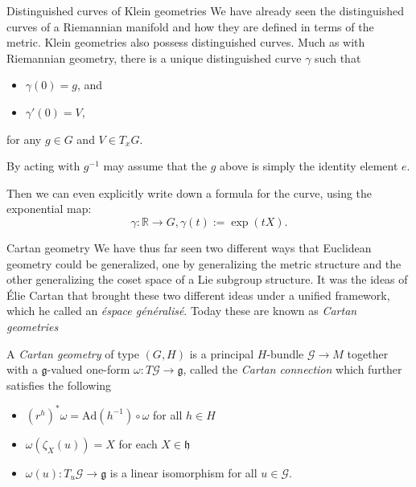 \documentclass[handout]{beamer}
\newcommand{\RR}{\mathbb{R}}
\begin{document}
\begin{frame}{Distinguished curves of Klein geometries}
  We have already seen the distinguished curves of a Riemannian manifold and how they are defined in terms of the metric.
  Klein geometries also possess distinguished curves. 
  Much as with Riemannian geometry, there is a unique distinguished curve $\gamma$ such that 
  \begin{itemize}
    \item $\gamma(0) = g$, and 
    \item $\gamma'(0) = V$,
  \end{itemize}
  for any $g\in G$ and $V \in T_x G$.

  By acting with $g^{-1}$ may assume that the $g$ above is simply the identity element $e$.

  Then we can even explicitly write down a formula for the curve, using the exponential map:
  \[
    \gamma : \RR \to G, \gamma(t) := \exp(tX).
  \]
\end{frame}

\begin{frame}{Cartan geometry}
  We have thus far seen two different ways that Euclidean geometry could be generalized, one by generalizing the metric structure and the other generalizing the coset space of a Lie subgroup structure.
  It was the ideas of \'{E}lie Cartan that brought these two different ideas under a unified framework, which he called an \emph{\'{e}space g\'{e}n\'{e}ralis\'{e}}.
  Today these are known as \emph{Cartan geometries}
  \begin{definition}
    A \emph{Cartan geometry} of type $(G,H)$ is a principal $H$-bundle $\mathcal{G} \to M$ together with a $\mathfrak{g}$-valued one-form $\omega : T\mathcal{G} \to \mathfrak{g}$, called the \emph{Cartan connection} which further satisfies the following
    \begin{itemize}
      \item $(r^h)^* \omega = \text{Ad}(h^{-1}) \circ \omega$ for all $h\in H$
      \item $\omega(\zeta_X(u)) = X$ for each $X\in \mathfrak{h}$
      \item $\omega(u) : T_u \mathcal{G} \to \mathfrak{g}$ is a linear isomorphism for all $u\in\mathcal{G}$.
    \end{itemize}
  \end{definition}
\end{frame}
\end{document}
